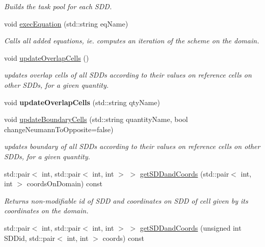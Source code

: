 \begin{DoxyCompactItemize}
\begin{DoxyCompactList}\small\item\em Builds the task pool for each S\+DD. \end{DoxyCompactList}\item 
\mbox{\label{classDomain_a25f3b3d25cb0a864f0c3e380cb9044be}} 
void \hyperlink{classDomain_a25f3b3d25cb0a864f0c3e380cb9044be}{exec\+Equation} (std\+::string eq\+Name)
\begin{DoxyCompactList}\small\item\em Calls all added equations, ie. computes an iteration of the scheme on the domain. \end{DoxyCompactList}\item 
void \hyperlink{classDomain_a4411f8eb6c118c84f16d62a411b4432a}{update\+Overlap\+Cells} ()
\begin{DoxyCompactList}\small\item\em updates overlap cells of all S\+D\+Ds according to their values on reference cells on other S\+D\+Ds, for a given quantity. \end{DoxyCompactList}\item 
\mbox{\label{classDomain_a3e6670e39e3a6265ee57baeb70aa8867}} 
void {\bfseries update\+Overlap\+Cells} (std\+::string qty\+Name)
\item 
void \hyperlink{classDomain_af169473470489edc4235399887c10da0}{update\+Boundary\+Cells} (std\+::string quantity\+Name, bool change\+Neumann\+To\+Opposite=false)
\begin{DoxyCompactList}\small\item\em updates boundary of all S\+D\+Ds according to their values on reference cells on other S\+D\+Ds, for a given quantity. \end{DoxyCompactList}\item 
std\+::pair$<$ int, std\+::pair$<$ int, int $>$ $>$ \hyperlink{classDomain_a5b3fd7cbe29576ea63219b326c15680e}{get\+S\+D\+Dand\+Coords} (std\+::pair$<$ int, int $>$ coords\+On\+Domain) const
\begin{DoxyCompactList}\small\item\em Returns non-\/modifiable id of S\+DD and coordinates on S\+DD of cell given by its coordinates on the domain. \end{DoxyCompactList}\item 
std\+::pair$<$ int, std\+::pair$<$ int, int $>$ $>$ \hyperlink{classDomain_af6442039d5c64b9a59b7a1bd94fc6bbb}{get\+S\+D\+Dand\+Coords} (unsigned int S\+D\+Did, std\+::pair$<$ int, int $>$ coords) const

\end{DoxyCompactItemize}

